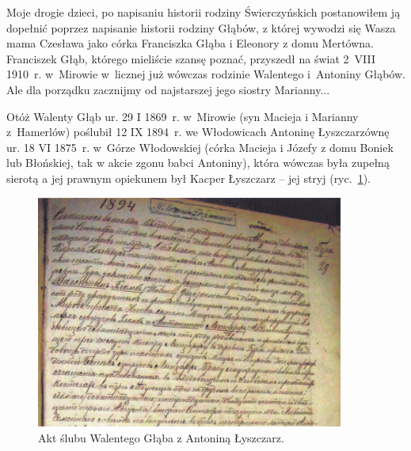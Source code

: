 Moje drogie dzieci, po napisaniu historii rodziny Świerczyńskich postanowiłem ją dopełnić poprzez napisanie historii rodziny Głąbów, z której wywodzi się Wasza mama Czesława jako córka Franciszka Głąba i Eleonory z domu Mertówna. Franciszek Głąb, którego mieliście szansę poznać, przyszedł na świat 2~VIII 1910~r. w~Mirowie w~licznej już wówczas rodzinie Walentego i~Antoniny Głąbów. Ale dla porządku zacznijmy od najstarszej jego siostry Marianny...

Otóż Walenty Głąb ur. 29 I 1869~r. w~Mirowie (syn Macieja i Marianny z~Hamerlów) poślubił 12 IX 1894~r. we Włodowicach Antoninę Łyszczarzównę ur. 18 VI 1875~r. w~Górze Włodowskiej (córka Macieja i Józefy z domu Boniek lub Błońskiej, tak w akcie zgonu babci Antoniny), która wówczas była zupełną sierotą a jej prawnym opiekunem był Kacper Łyszczarz -- jej stryj (ryc.~\ref{rys:akt_slubu_walentego_glaba_i_antoniny_lyszczarz}).

\begin{figure}[!h]
\begin{center}
\includegraphics[width=0.9\textwidth]{zdjecia/akt_slubu_walentego_glaba_i_antoniny_lyszczarz.jpg}
\caption{Akt ślubu Walentego Głąba z Antoniną Łyszczarz.}
\label{rys:akt_slubu_walentego_glaba_i_antoniny_lyszczarz}
\end{center}
\end{figure}
